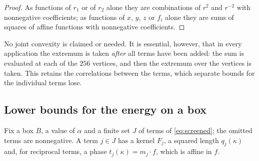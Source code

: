 \begin{proof}
As functions of $r_1$ or of $r_2$ alone they are combinations of $r^2$ and $r^{-2}$ with nonnegative coefficients; as functions of
$x$, $y$, $z$ or $f_i$ alone they are sums of squares of affine functions with nonnegative coefficients.
\end{proof}

No joint convexity is claimed or needed. It is essential, however, that in every application the extremum is taken \emph{after} all
terms have been added: the sum is evaluated at each of the $256$ vertices, and then the extremum over the vertices is taken. This
retains the correlations between the terms, which separate bounds for the individual terms lose.

\subsection{Lower bounds for the energy on a box}\label{ssec:energyrules}

Fix a box $B$, a value of $\alpha$ and a finite set $J$ of terms of \eqref{eq:screened}; the omitted terms are nonnegative. A term
$j\in J$ has a kernel $F_j$, a squared length $q_j(\kappa)$ and, for reciprocal terms, a phase $t_j(\kappa)=m_j\cdot f$, which is affine
in $f$.

